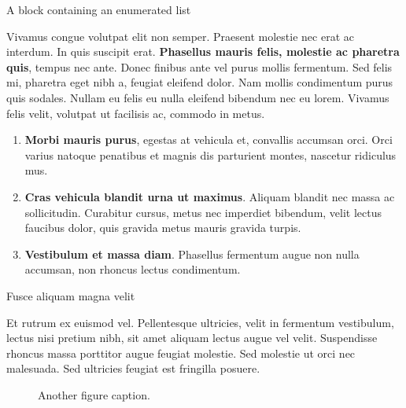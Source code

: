 \documentclass[final]{beamer}
\newlength{\colwidth}
\begin{document}
\begin{frame}[t]
\begin{columns}[t]
\begin{column}{\colwidth}
  \begin{block}{A block containing an enumerated list}

    Vivamus congue volutpat elit non semper. Praesent molestie nec erat ac
    interdum. In quis suscipit erat. \textbf{Phasellus mauris felis, molestie
    ac pharetra quis}, tempus nec ante. Donec finibus ante vel purus mollis
    fermentum. Sed felis mi, pharetra eget nibh a, feugiat eleifend dolor. Nam
    mollis condimentum purus quis sodales. Nullam eu felis eu nulla eleifend
    bibendum nec eu lorem. Vivamus felis velit, volutpat ut facilisis ac,
    commodo in metus.

    \begin{enumerate}
      \item \textbf{Morbi mauris purus}, egestas at vehicula et, convallis
        accumsan orci. Orci varius natoque penatibus et magnis dis parturient
        montes, nascetur ridiculus mus.
      \item \textbf{Cras vehicula blandit urna ut maximus}. Aliquam blandit nec
        massa ac sollicitudin. Curabitur cursus, metus nec imperdiet bibendum,
        velit lectus faucibus dolor, quis gravida metus mauris gravida turpis.
      \item \textbf{Vestibulum et massa diam}. Phasellus fermentum augue non
        nulla accumsan, non rhoncus lectus condimentum.
    \end{enumerate}

  \end{block}

  \begin{block}{Fusce aliquam magna velit}

    Et rutrum ex euismod vel. Pellentesque ultricies, velit in fermentum
    vestibulum, lectus nisi pretium nibh, sit amet aliquam lectus augue vel
    velit. Suspendisse rhoncus massa porttitor augue feugiat molestie. Sed
    molestie ut orci nec malesuada. Sed ultricies feugiat est fringilla
    posuere.

    \begin{figure}
      \centering
      \caption{Another figure caption.}
    \end{figure}


\end{block}
\end{column}
\end{columns}
\end{frame}
\end{document}
